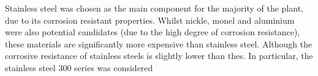 Stainless steel was chosen as the main component for the majority of the plant, due to its corrosion resistant properties. Whilst nickle, monel and aluminium were also potential candidates (due to the high degree of corrosion resistance), these materials are significantly more expensive than stainless steel. Although the corrosive resistance of stainless steels is slightly lower than thes. In particular, the stainless steel 300 series was considered


